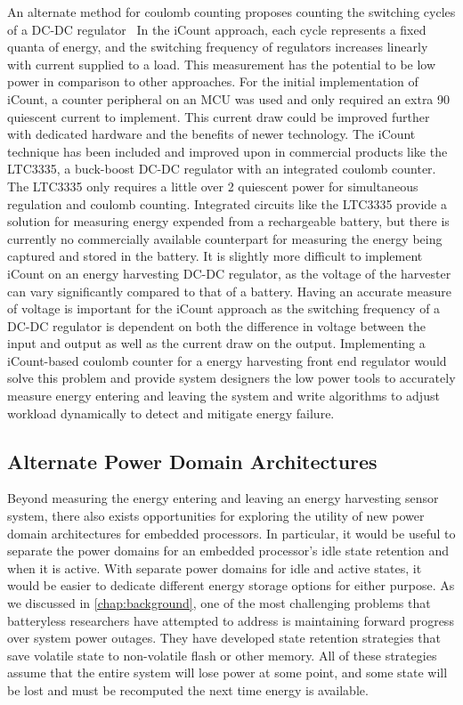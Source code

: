 An alternate method for coulomb counting proposes counting the switching cycles of a DC-DC regulator~\cite{duttaEnergy08} In the iCount approach, each cycle represents a fixed quanta of energy, and the switching frequency of regulators increases linearly with current supplied to a load.
This measurement has the potential to be low power in comparison to other approaches.
For the initial implementation of iCount, a counter peripheral on an MCU was used and only required an extra 90\ssi{\nano\ampere} quiescent current to implement. This current draw could be improved further with dedicated hardware and the benefits of newer technology.
The iCount technique has been included and improved upon in commercial products like the LTC3335, a buck-boost DC-DC regulator with an integrated coulomb counter.
The LTC3335 only requires a little over 2\ssi{\micro\watt} quiescent power for simultaneous regulation and coulomb counting.
Integrated circuits like the LTC3335 provide a solution for measuring energy expended from a rechargeable battery, but there is currently no commercially available counterpart for measuring the energy being captured and stored in the battery.
It is slightly more difficult to implement iCount on an energy harvesting DC-DC regulator, as the voltage of the harvester can vary significantly compared to that of a battery.
Having an accurate measure of voltage is important for the iCount approach as the switching frequency of a DC-DC regulator is dependent on both the difference in voltage between the input and output as well as the current draw on the output.
Implementing a iCount-based coulomb counter for a
energy harvesting front end regulator would solve this problem and provide system designers the low power tools to accurately measure energy entering and leaving the system and write algorithms to adjust workload dynamically to detect and mitigate energy failure.

\subsection{Alternate Power Domain Architectures}
Beyond measuring the energy entering and leaving an energy harvesting sensor system, there also exists opportunities for exploring the utility of new power domain architectures for embedded processors.
In particular, it would be useful to separate the power domains for an embedded processor's idle state retention and when it is active.
With separate power domains for idle and active states, it would be easier to dedicate different energy storage options for either purpose.
As we discussed in \cref{chap:background}, one of the most challenging problems that batteryless researchers have attempted to address is maintaining forward progress over system power outages.
They have developed state retention strategies that save volatile state to non-volatile flash or other memory.
All of these strategies assume that the entire system will lose power at some point, and some state will be lost and must be recomputed the next time energy is available.

